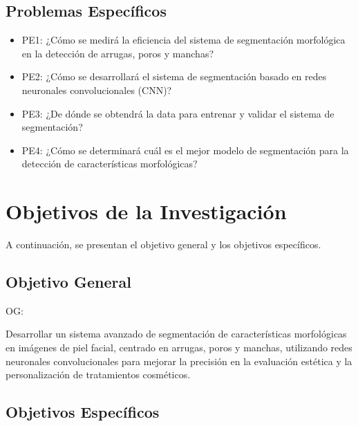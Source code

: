 \subsection{Problemas Específicos}
\newcommand{\Pbone}{
¿Cómo se medirá la eficiencia del sistema de segmentación morfológica en la detección de arrugas, poros y manchas?
}
\newcommand{\Pbtwo}{
¿Cómo se desarrollará el sistema de segmentación basado en redes neuronales convolucionales (CNN)?
}
\newcommand{\Pbthree}{
¿De dónde se obtendrá la data para entrenar y validar el sistema de segmentación?
}

\newcommand{\Pbfour}{
¿Cómo se determinará cuál es el mejor modelo de segmentación para la detección de características morfológicas?
}

\begin{itemize}
	\item PE1: {\Pbone}
	\item PE2: {\Pbtwo}
	\item PE3: {\Pbthree}
	\item PE4: {\Pbfour}
\end{itemize}

\section{Objetivos de la Investigación}
A continuación, se presentan el objetivo general y los objetivos específicos.
\subsection{Objetivo General}
OG: \newcommand{\ObjetivoGeneral}{
	
Desarrollar un sistema avanzado de segmentación de características morfológicas en imágenes de piel facial, centrado en arrugas, poros y manchas, utilizando redes neuronales convolucionales para mejorar la precisión en la evaluación estética y la personalización de tratamientos cosméticos.

}
\ObjetivoGeneral
\subsection{Objetivos Específicos}
\newcommand{\Objone}{
Desarrollar métricas de evaluación como precisión, recall, F1-score y AUC-ROC para medir la eficiencia del sistema de segmentación en la identificación de características morfológicas de la piel facial.
}

\newcommand{\Objtwo}{
Desarrollar e implementar un sistema de segmentación utilizando redes neuronales convolucionales, adaptando sus arquitecturas para la detección y diferenciación de características morfológicas de la piel como arrugas, poros y manchas.
}

